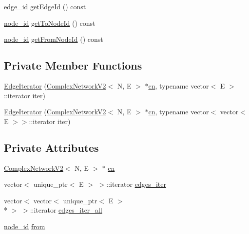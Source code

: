 \begin{DoxyCompactItemize}
\item 
\hyperlink{_complex_network_8hpp_ad7d18d7b90a45b6625704e92d10aa3a0}{edge\+\_\+id} \hyperlink{class_complex_network_v2_1_1_edge_iterator_a2bf088c84d8e6fc5607513613d1b426b}{get\+Edge\+Id} () const 
\item 
\hyperlink{_complex_network_8hpp_a8323334ca788fde39682469321590d52}{node\+\_\+id} \hyperlink{class_complex_network_v2_1_1_edge_iterator_a2e7e551036120313906fa8b346cef1b9}{get\+To\+Node\+Id} () const 
\item 
\hyperlink{_complex_network_8hpp_a8323334ca788fde39682469321590d52}{node\+\_\+id} \hyperlink{class_complex_network_v2_1_1_edge_iterator_a2abaa9cbc98e0e96af88a9e6deba2282}{get\+From\+Node\+Id} () const 
\end{DoxyCompactItemize}
\subsection*{Private Member Functions}
\begin{DoxyCompactItemize}
\item 
\hyperlink{class_complex_network_v2_1_1_edge_iterator_ad60d1d70484d303a9b2be38e556567d6}{Edge\+Iterator} (\hyperlink{class_complex_network_v2}{Complex\+Network\+V2}$<$ N, E $>$ $\ast$\hyperlink{class_complex_network_v2_1_1_edge_iterator_a709735909d7520bbca232fa1ca059b8e}{cn}, typename vector$<$ E $>$\+::iterator iter)
\item 
\hyperlink{class_complex_network_v2_1_1_edge_iterator_ab1b0ff7b139d0e192a9be548b75c3829}{Edge\+Iterator} (\hyperlink{class_complex_network_v2}{Complex\+Network\+V2}$<$ N, E $>$ $\ast$\hyperlink{class_complex_network_v2_1_1_edge_iterator_a709735909d7520bbca232fa1ca059b8e}{cn}, typename vector$<$ vector$<$ E $>$$>$\+::iterator iter)
\end{DoxyCompactItemize}
\subsection*{Private Attributes}
\begin{DoxyCompactItemize}
\item 
\hyperlink{class_complex_network_v2}{Complex\+Network\+V2}$<$ N, E $>$ $\ast$ \hyperlink{class_complex_network_v2_1_1_edge_iterator_a709735909d7520bbca232fa1ca059b8e}{cn}
\item 
vector$<$ unique\+\_\+ptr$<$ E $>$ $>$\+::iterator \hyperlink{class_complex_network_v2_1_1_edge_iterator_a5188ace1babf02c9839d5e277e1d2842}{edges\+\_\+iter}
\item 
vector$<$ vector$<$ unique\+\_\+ptr$<$ E $>$\\*
 $>$ $>$\+::iterator \hyperlink{class_complex_network_v2_1_1_edge_iterator_a9e36b31624697cb24ff09aac7b56570a}{edges\+\_\+iter\+\_\+all}
\item 
\hyperlink{_complex_network_8hpp_a8323334ca788fde39682469321590d52}{node\+\_\+id} \hyperlink{class_complex_network_v2_1_1_edge_iterator_a9c12853c790c6168d6439e84f9093e61}{from}
\end{DoxyCompactItemize}
